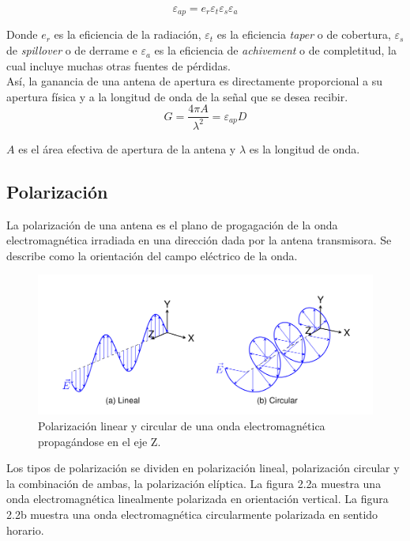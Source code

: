 \begin{equation}
    \varepsilon_{ap} = e_{r} \varepsilon_{t} \varepsilon_{s} \varepsilon_{a}
\end{equation}

Donde $e_{r}$ es la eficiencia de la radiación, $\varepsilon_{t}$ es la eficiencia \textit{taper} o de cobertura, $\varepsilon_{s}$ de \textit{spillover} o de derrame e $\varepsilon_{a}$ es la eficiencia de \textit{achivement} o de completitud, la cual incluye muchas otras fuentes de pérdidas.\\

Así, la ganancia de una antena de apertura es directamente proporcional a su apertura física y a la longitud de onda de la señal que se desea recibir.\\

\begin{equation}
    G = \frac{4\pi A}{\lambda^{2}} = \varepsilon_{ap} D
\end{equation}

$A$ es el área efectiva de apertura de la antena y $\lambda$ es la longitud de onda.\\

\subsection{Polarización}

La polarización de una antena es el plano de progagación de la onda electromagnética irradiada en una dirección dada por la antena transmisora. Se describe como la orientación del campo eléctrico de la onda.\\

\begin{figure}
    \centering
    \includegraphics[width = 0.8\linewidth]{img/pol}
    \caption{Polarización linear y circular de una onda electromagnética propagándose en el eje Z.}
    \label{fig:polarizacion2}
\end{figure}

Los tipos de polarización se dividen en polarización lineal, polarización circular y la combinación de ambas, la polarización elíptica. La figura 2.2a muestra una onda electromagnética linealmente polarizada en orientación vertical. La figura 2.2b muestra una onda electromagnética circularmente polarizada en sentido horario.\\



